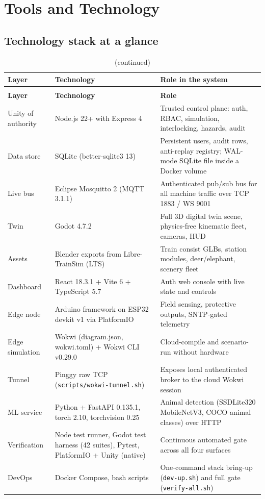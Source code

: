 \chapter{Tools and Technology}\label{cha:tools}

\section{Technology stack at a glance}

\begin{longtable}{>{\raggedright}p{2.4cm} >{\raggedright\arraybackslash}p{4.6cm} >{\raggedright\arraybackslash}p{8.4cm}}
\caption{Complete technology stack}\label{tab:stacksummary}\\
\toprule
\textbf{Layer} & \textbf{Technology} & \textbf{Role in the system} \\
\midrule
\endfirsthead
\caption[]{(continued)}\\
\toprule
\textbf{Layer} & \textbf{Technology} & \textbf{Role} \\
\midrule
\endhead
Unity of authority & Node.js 22+ with Express 4 & Trusted control plane: auth, RBAC, simulation, interlocking, hazards, audit \\
Data store & SQLite (better-sqlite3 13) & Persistent users, audit rows, anti-replay registry; WAL-mode SQLite file inside a Docker volume \\
Live bus & Eclipse Mosquitto 2 (MQTT 3.1.1) & Authenticated pub/sub bus for all machine traffic over TCP 1883 / WS 9001 \\
Twin & Godot 4.7.2 & Full 3D digital twin scene, physics-free kinematic fleet, cameras, HUD \\
Assets & Blender exports from Libre-TrainSim (LTS) & Train consist GLBs, station modules, deer/elephant, scenery fleet \\
Dashboard & React 18.3.1 + Vite 6 + TypeScript 5.7 & Auth web console with live state and controls \\
Edge node & Arduino framework on ESP32 devkit v1 via PlatformIO & Field sensing, protective outputs, SNTP-gated telemetry \\
Edge simulation & Wokwi (diagram.json, wokwi.toml) + Wokwi CLI v0.29.0 & Cloud-compile and scenario-run without hardware \\
Tunnel & Pinggy raw TCP (\texttt{scripts/wokwi-tunnel.sh}) & Exposes local authenticated broker to the cloud Wokwi session \\
ML service & Python + FastAPI 0.135.1, torch 2.10, torchvision 0.25 & Animal detection (SSDLite320 MobileNetV3, COCO animal classes) over HTTP \\
Verification & Node test runner, Godot test harness (42 suites), Pytest, PlatformIO + Unity (native) & Continuous automated gate across all four surfaces \\
DevOps & Docker Compose, bash scripts & One-command stack bring-up (\texttt{dev-up.sh}) and full gate (\texttt{verify-all.sh}) \\
\bottomrule
\end{longtable}

